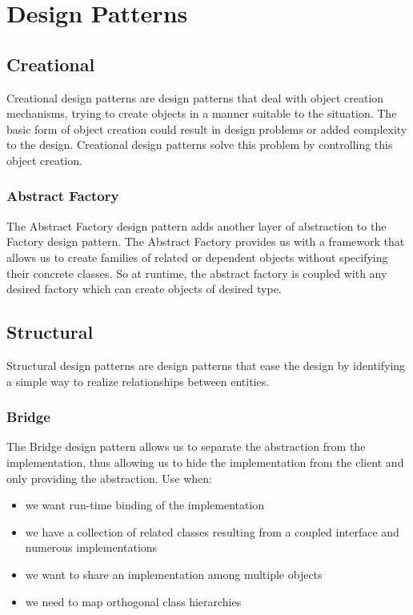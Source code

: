 \chapter{Design Patterns}

\section{Creational}
Creational design patterns are design patterns that deal with object creation
mechanisms, trying to create objects in a manner suitable to the situation. The basic form of object
creation could result in design problems or added complexity to the design. Creational design patterns
solve this problem by controlling this object creation.

\subsection{Abstract Factory}
The Abstract Factory design pattern adds another layer of abstraction to the Factory design pattern.
The Abstract Factory provides us with a framework that allows us to create families of related or
dependent objects without specifying their concrete classes. So at runtime, the abstract factory is
coupled with any desired factory which can create objects of desired type.

\section{Structural}
Structural design patterns are design patterns that ease the design by identifying a simple way to
realize relationships between entities.

\subsection{Bridge}
The Bridge design pattern allows us to separate the abstraction from the implementation, thus
allowing us to hide the implementation from the client and only providing the abstraction.
Use when:
\begin{itemize}
	\item we want run-time binding of the implementation
	\item we have a collection of related classes resulting from a coupled interface and numerous
	      implementations
	\item we want to share an implementation among multiple objects
	\item we need to map orthogonal class hierarchies
\end{itemize}